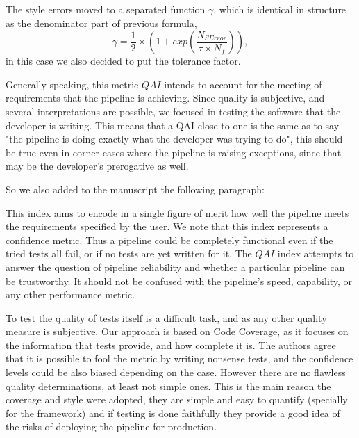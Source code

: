 \documentclass[a4paper,onecolumn,fleqn,usenatbib,useAMS]{mnrasr}
\newenvironment{frshaded}{%
\def\FrameCommand{\fboxrule=\FrameRule\fboxsep=\FrameSep \fcolorbox{framecolor}{shadecolor}}%
\MakeFramed {\FrameRestore}}%
{\endMakeFramed}
\begin{document}
The style errors moved to a separated function $\gamma$, 
which is identical in structure as the denominator part of previous formula,
\begin{displaymath}
 \gamma = \frac{1}{2} \times \left( 1 + exp \left( \frac{N_{SError}}{\tau \times N_f} \right)\right),
\end{displaymath}
in this case we also decided to put the tolerance factor.

Generally speaking, this metric $QAI$ intends to account for the meeting of
requirements that the pipeline is achieving. 
%
Since quality is subjective, and several interpretations are possible,
we focused in testing the software that the developer is writing.  
%
This means that a QAI close to one is the same as to say "the 
pipeline is doing exactly what the developer was trying to do", 
this should be true even in corner cases where the pipeline is raising exceptions,
since that may be the developer’s prerogative as well.

So we also added to the manuscript the following paragraph:

\begin{frshaded}
\begin{multicols}{2} 
   
This index aims to encode in a single figure of merit how well the pipeline
meets the requirements specified by the user.
%
We note that this index represents a confidence metric. 
%
Thus a pipeline could be completely functional even if the 
tried tests all fail, or if no tests are yet written for it.
%
The $QAI$ index attempts to answer the question of pipeline
reliability and whether a particular pipeline can be trustworthy.
%
It should not be confused with the pipeline's speed,
capability, or any other performance metric.
%
\end{multicols} \end{frshaded} 

To test the quality of tests itself is a difficult task, 
and as any other quality measure is subjective. 
%
Our approach is based on Code Coverage, as it focuses on 
the information that tests provide, and how complete it is.
%
The authors agree that it is possible to fool the metric by
writing nonsense tests, and the confidence levels could be also
biased depending on the case. 
%
However there are no flawless quality determinations, at least
not simple ones. This is the main reason the coverage and style
were adopted, they are simple and easy to quantify (specially
for the framework) and if testing is done faithfully they provide
a good idea of the risks of deploying the pipeline for production.
%
\end{document}
